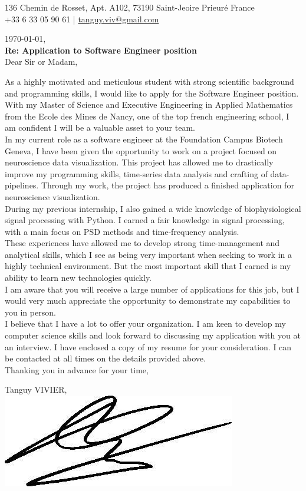 \documentclass[]{cv-style}          %
\newcommand{\position}{Software Engineer }
\newcommand{\customparagraph}{During my previous internship, I also gained a wide knowledge of biophysiological signal processing with Python. I earned a fair knowledge in signal processing, with a main focus on PSD methods and time-frequency analysis.}
\begin{document}
\huge
{}
\vspace{-0.9cm}
\begin{center}
    \large
    136 Chemin de Rosset, Apt. A102, 73190 Saint-Jeoire Prieuré France \\  +33 6 33 05 90 61 | \href{tanguy.viv@gmail.com}{tanguy.viv@gmail.com}
\end{center}
\vspace{0.5cm}
\begin{flushleft}
    \large
    \today, \\[0.5cm]
    \textbf{Re: Application to \position position}\\[0.5cm]
    Dear Sir or Madam,
\end{flushleft}
\vspace{0.5cm}
\large
As a highly motivated and meticulous student with strong scientific background and programming skills, I would like to apply for the \position  position. With my Master of Science and Executive Engineering in Applied Mathematics from the Ecole des Mines de Nancy, one of the top french engineering school, I am confident I will be a valuable asset to your team. \\[0.5cm]
In my current role as a software engineer at the Foundation Campus Biotech Geneva, I have been given the opportunity to work on a project focused on neuroscience data visualization. This project has allowed me to drastically improve my programming skills, time-series data analysis and crafting of data-pipelines. Through my work, the project has produced a finished application for neuroscience visualization. \\[0.5cm]
\customparagraph \\[0.5cm]
These experiences have allowed me to develop strong time-management and analytical skills, which I see as being very important when seeking to work in a highly technical environment. But the most important skill that I earned is my ability to learn new technologies quickly. \\[0.5cm]
I am aware that you will receive a large number of applications for this job, but I would very much appreciate the opportunity to demonstrate my capabilities to you in person. \\[0.5cm]
I believe that I have a lot to offer your organization. I am keen to develop my computer science skills and look forward to discussing my application with you at an interview. I have enclosed a copy of my resume for your consideration. I can be contacted at all times on the details provided above. \\[0.5cm]
Thanking you in advance for your time, \\[0.5cm]
%
\begin{flushright}
\parbox{5cm}{
\centering
    Tanguy VIVIER,\\
    \hspace{2cm}\includegraphics[scale=0.4]{signature.jpg}
}
\end{flushright}
\end{document}
